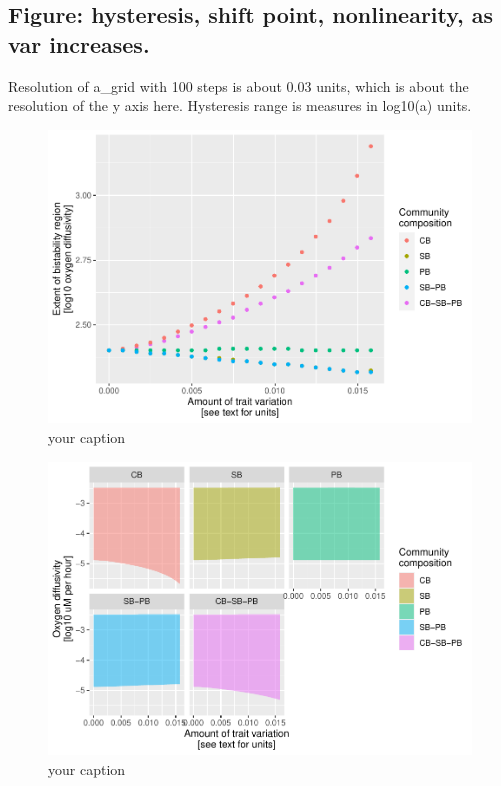 \documentclass{article}
\begin{document}
\hypertarget{figure-hysteresis-shift-point-nonlinearity-as-var-increases.}{%
\subsection{Figure: hysteresis, shift point, nonlinearity, as var
increases.}\label{figure-hysteresis-shift-point-nonlinearity-as-var-increases.}}

Resolution of a\_grid with 100 steps is about 0.03 units, which is about
the resolution of the y axis here. Hysteresis range is measures in
log10(a) units.

\begin{figure}

{\centering \includegraphics[width=1\linewidth]{article_files/figure-latex/ss_var3-1} 

}

\caption{your caption}\label{fig:ss_var3}
\end{figure}

\begin{figure}

{\centering \includegraphics[width=1\linewidth]{article_files/figure-latex/ss_var4-1} 

}

\caption{your caption}\label{fig:ss_var4}
\end{figure}
\end{document}
